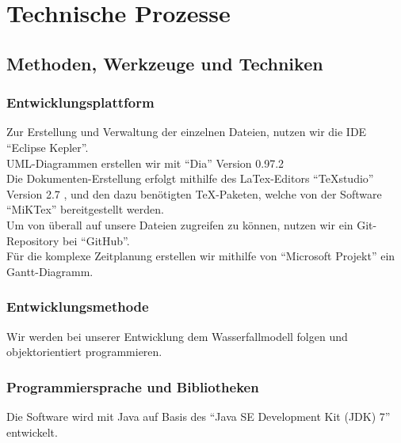 \section{Technische Prozesse}
\subsection{Methoden, Werkzeuge und Techniken}
\subsubsection{Entwicklungsplattform}
Zur Erstellung und Verwaltung der einzelnen Dateien, nutzen wir die IDE "`Eclipse Kepler"'. \cite{eclipse}\\
UML-Diagrammen erstellen wir mit "`Dia"' Version 0.97.2 \cite{dia}\\
Die Dokumenten-Erstellung erfolgt mithilfe des LaTex-Editors "`TeXstudio"' Version 2.7 \cite{tex}, und den dazu benötigten TeX-Paketen, welche von der Software "`MiKTex"' bereitgestellt werden. \cite{miktex}\\
Um von überall auf unsere Dateien zugreifen zu können, nutzen wir ein Git-Repository bei "`GitHub"'. \cite{github}\\
Für die komplexe Zeitplanung erstellen wir mithilfe von "`Microsoft Projekt"' ein Gantt-Diagramm. \cite{projekt}

\subsubsection{Entwicklungsmethode}

Wir werden bei unserer Entwicklung dem Wasserfallmodell folgen und objektorientiert programmieren.  \cite{wasserfall}

\subsubsection{Programmiersprache und Bibliotheken}

Die Software wird mit Java auf Basis des "`Java SE Development Kit (JDK) 7"' entwickelt. \cite{java}\\

